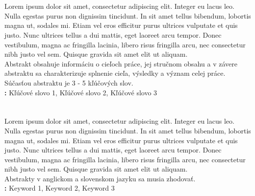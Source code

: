 \makeatletter
\renewenvironment{abstract}{
    \if@twocolumn
        \section*{\abstractname}%
    \else
        \begin{flushleft} %
            {\bfseries \abstractname\vspace{2em}\par}%
        \end{flushleft}%
        \noindent\justifying
    \fi
}
{
    \if@twocolumn\else\par\fi
}
\makeatother

\begin{abstract}%
    Lorem ipsum dolor sit amet, consectetur adipiscing elit. Integer eu lacus leo. Nulla egestas purus non dignissim tincidunt. In sit amet tellus bibendum, lobortis magna ut, sodales mi. Etiam vel eros efficitur purus ultrices vulputate et quis justo. Nunc ultrices tellus a dui mattis, eget laoreet arcu tempor. Donec vestibulum, magna ac fringilla lacinia, libero risus fringilla arcu, nec consectetur nibh justo vel sem. Quisque gravida sit amet elit ut aliquam.\\
    \hfill \break
    \small{Abstrakt obsahuje informáciu o cieľoch práce, jej stručnom obsahu a v závere abstraktu sa charakterizuje splnenie cieľa, výsledky a význam celej práce. Súčasťou abstraktu je 3 - 5 kľúčových slov.}
\vspace{1em}\\
\textbf{\lnkeywords:} Kľúčové slovo 1, Kľúčové slovo 2, Kľúčové slovo 3
\end{abstract}

\pagebreak

\begin{otherlanguage}{\secondlang}
\begin{abstract}%
    Lorem ipsum dolor sit amet, consectetur adipiscing elit. Integer eu lacus leo. Nulla egestas purus non dignissim tincidunt. In sit amet tellus bibendum, lobortis magna ut, sodales mi. Etiam vel eros efficitur purus ultrices vulputate et quis justo. Nunc ultrices tellus a dui mattis, eget laoreet arcu tempor. Donec vestibulum, magna ac fringilla lacinia, libero risus fringilla arcu, nec consectetur nibh justo vel sem. Quisque gravida sit amet elit ut aliquam.\\ 
    \hfill \break
    \small{Abstrakty v anglickom a slovenskom jazyku sa musia zhodovať.}
\vspace{1em}\\
\textbf{\lnkeywords:} Keyword 1, Keyword 2, Keyword 3
\end{abstract}
\end{otherlanguage}

